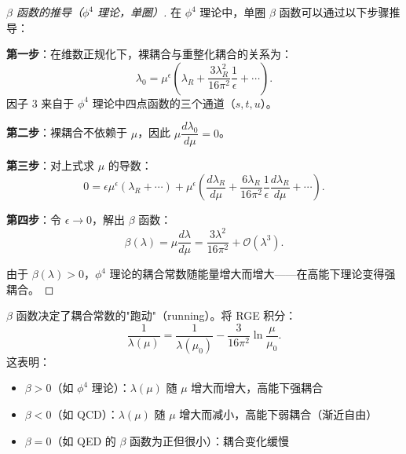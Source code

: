 \begin{proof}[ $\beta$ 函数的推导（$\phi^4$ 理论，单圈）]
在 $\phi^4$ 理论中，单圈 $\beta$ 函数可以通过以下步骤推导：

\textbf{第一步}：在维数正规化下，裸耦合与重整化耦合的关系为：
\begin{equation}
    \lambda_0 = \mu^\epsilon\left(\lambda_R + \frac{3\lambda_R^2}{16\pi^2}\frac{1}{\epsilon} + \cdots\right).
\end{equation}
因子 $3$ 来自于 $\phi^4$ 理论中四点函数的三个通道（$s, t, u$）。

\textbf{第二步}：裸耦合不依赖于 $\mu$，因此 $\mu\dfrac{d\lambda_0}{d\mu} = 0$。

\textbf{第三步}：对上式求 $\mu$ 的导数：
\begin{equation}
    0 = \epsilon\mu^\epsilon\left(\lambda_R + \cdots\right) + \mu^\epsilon\left(\frac{d\lambda_R}{d\mu} + \frac{6\lambda_R}{16\pi^2}\frac{1}{\epsilon}\frac{d\lambda_R}{d\mu} + \cdots\right).
\end{equation}

\textbf{第四步}：令 $\epsilon \to 0$，解出 $\beta$ 函数：
\begin{equation}
    \beta(\lambda) = \mu\frac{d\lambda}{d\mu} = \frac{3\lambda^2}{16\pi^2} + \mathcal{O}(\lambda^3).
\end{equation}

由于 $\beta(\lambda) > 0$，$\phi^4$ 理论的耦合常数随能量增大而增大——在高能下理论变得强耦合。
\end{proof}

\begin{property}[跑动耦合常数]
$\beta$ 函数决定了耦合常数的"跑动"（running）。将 RGE 积分：
\begin{equation}
    \frac{1}{\lambda(\mu)} = \frac{1}{\lambda(\mu_0)} - \frac{3}{16\pi^2}\ln\frac{\mu}{\mu_0}.
\end{equation}
这表明：
\begin{itemize}
    \item $\beta > 0$（如 $\phi^4$ 理论）：$\lambda(\mu)$ 随 $\mu$ 增大而增大，高能下强耦合
    \item $\beta < 0$（如 QCD）：$\lambda(\mu)$ 随 $\mu$ 增大而减小，高能下弱耦合（渐近自由）
    \item $\beta = 0$（如 QED 的 $\beta$ 函数为正但很小）：耦合变化缓慢
\end{itemize}
\end{property}

